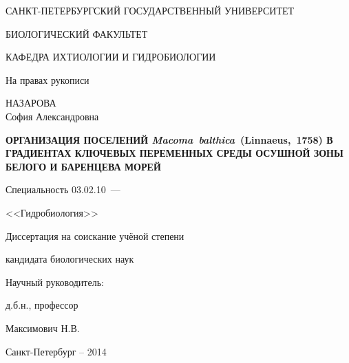 \thispagestyle{empty}

\begin{center}
САНКТ-ПЕТЕРБУРГСКИЙ ГОСУДАРСТВЕННЫЙ УНИВЕРСИТЕТ\par
БИОЛОГИЧЕСКИЙ ФАКУЛЬТЕТ\par
КАФЕДРА ИХТИОЛОГИИ И ГИДРОБИОЛОГИИ\par  
\par
\end{center}

\vspace{20mm}
\begin{flushright}
На правах рукописи

\end{flushright}

\vspace{30mm}
\begin{center}
{\large НАЗАРОВА\\ София Александровна}
\end{center}

\vspace{5mm}
\begin{center}
{\bfseries \large ОРГАНИЗАЦИЯ ПОСЕЛЕНИЙ {\itshape Macoma~balthica}~(Linnaeus,~1758) В ГРАДИЕНТАХ КЛЮЧЕВЫХ ПЕРЕМЕННЫХ СРЕДЫ ОСУШНОЙ ЗОНЫ БЕЛОГО И БАРЕНЦЕВА МОРЕЙ
\par}

\vspace{10mm}
{%
Специальность 03.02.10~---

<<Гидробиология>>
}

\vspace{10mm}
Диссертация на соискание учёной степени

кандидата биологических наук
\end{center}

\vspace{20mm}
\begin{flushright}
Научный руководитель:

д.б.н., профессор

Максимович Н.В.

\end{flushright}

\vspace{20mm}
\begin{center}
{Санкт-Петербург  -- 2014}
\end{center}

\newpage

